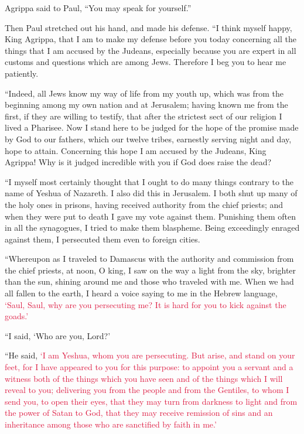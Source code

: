 \mychapter{} \myverse*{}Agrippa said to Paul, “You may speak for yourself.”

\quad\quad Then Paul stretched out his hand, and made his defense.
\myverse{}“I think myself happy, King Agrippa, that I am to make my defense before you
today concerning all the things that I am accused by the Judeans,
\myverse{}especially because you are expert in all customs and questions which are among Jews.
Therefore I beg you to hear me patiently.

\myverse{}“Indeed, all Jews know my way of life from my youth up, which
was from the beginning among my own nation and at Jerusalem;
\myverse{}having known me from the first, if they are willing to testify, that after
the strictest sect of our religion I lived a Pharisee.
\myverse{}Now I stand here to be judged for the hope of the promise made by God to our
fathers,
\myverse{}which our twelve tribes, earnestly serving night and day, hope to attain. Concerning
this hope I am accused by the Judeans, King Agrippa!
\myverse{}Why is it judged incredible with you if God does raise the dead?

\myverse{}“I myself most certainly thought that I ought to do many things
contrary to the name of Yeshua of Nazareth.
\myverse{}I also did this in Jerusalem. I both shut up many of the holy ones in prisons,
having received authority from the chief priests; and when they were put to death I gave my vote against
them.
\myverse{}Punishing them often in all the synagogues, I tried to make them blaspheme.
Being exceedingly enraged against them, I persecuted them even to foreign cities.

\myverse{}“Whereupon as I traveled to Damascus with the authority and
commission from the chief priests,
\myverse{}at noon, O king, I saw on the way a light from the sky, brighter than the
sun, shining around me and those who traveled with me.
\myverse{}When we had all fallen to the earth, I heard a voice saying to me in the
Hebrew language,
\textcolor{crimson}{‘Saul, Saul, why are you persecuting me? It is hard for you to kick against the goads.’}

\myverse{}“I said, ‘Who are you, Lord?’

“He said,
\textcolor{crimson}{‘I am Yeshua, whom you are persecuting.
}
\myverse{}\textcolor{crimson}{But arise, and stand on your feet, for I have appeared to you for this
	purpose: to appoint you a servant and a witness both of the things which you have seen and of the things
	which I will reveal to you;
}
\myverse{}\textcolor{crimson}{delivering you from the people and from the Gentiles, to whom I send
	you,
}
\myverse{}\textcolor{crimson}{to open their eyes, that they may turn from darkness to light and from
	the power of Satan to God, that they may receive remission of sins and an inheritance among those who
	are sanctified by faith in me.’}

